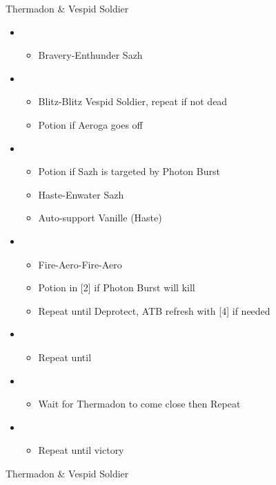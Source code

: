 \begin{paracol}{2}
\begin{battle}{Thermadon \& Vespid Soldier}
\begin{itemize}
			\item \first
			      \begin{itemize}
				      \item Bravery-Enthunder Sazh
			      \end{itemize}
			\item \sixth
			      \begin{itemize}
				      \item Blitz-Blitz Vespid Soldier, repeat if not dead
				      \item Potion if Aeroga goes off
			      \end{itemize}
			\item \first
			      \begin{itemize}
				      \item Potion if Sazh is targeted by Photon Burst
				      \item Haste-Enwater Sazh
				      \item Auto-support Vanille (Haste)
			      \end{itemize}
			\item \fifth
			      \begin{itemize}
				      \item Fire-Aero-Fire-Aero
				      \item Potion in [2] if Photon Burst will kill
				      \item Repeat until Deprotect, ATB refresh with [4] if needed
			      \end{itemize}
			\item \fourth
			      \begin{itemize}
				      \item Repeat until \stagger
			      \end{itemize}
			\item \second
			      \begin{itemize}
				      \item Wait for Thermadon to come close then Repeat
			      \end{itemize}
			\item \third
			      \begin{itemize}
				      \item Repeat until victory
			      \end{itemize}
		\end{itemize}
	\end{battle}
	\switchcolumn
	\begin{battle}{Thermadon \& Vespid Soldier}

\end{battle}
\end{paracol}
